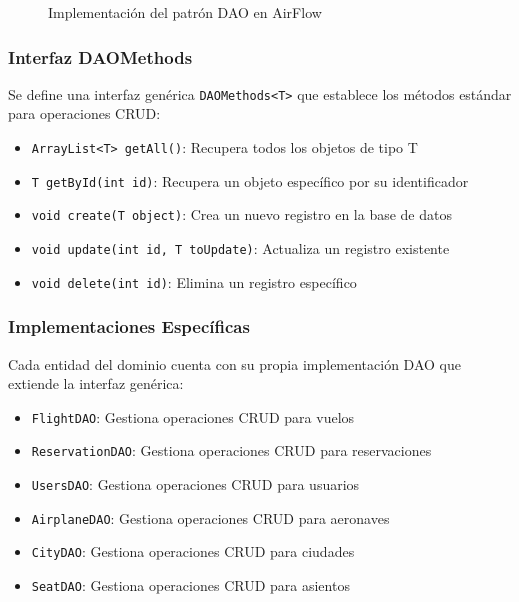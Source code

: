 \documentclass[12pt,a4paper]{article}
\begin{document}
\begin{figure}[H]
\centering
{}
\caption{Implementación del patrón DAO en AirFlow}
\end{figure}

\subsubsection{Interfaz DAOMethods}

Se define una interfaz genérica \texttt{DAOMethods<T>} que establece los métodos estándar para operaciones CRUD:

\begin{itemize}
    \item \texttt{ArrayList<T> getAll()}: Recupera todos los objetos de tipo T
    \item \texttt{T getById(int id)}: Recupera un objeto específico por su identificador
    \item \texttt{void create(T object)}: Crea un nuevo registro en la base de datos
    \item \texttt{void update(int id, T toUpdate)}: Actualiza un registro existente
    \item \texttt{void delete(int id)}: Elimina un registro específico
\end{itemize}

\subsubsection{Implementaciones Específicas}

Cada entidad del dominio cuenta con su propia implementación DAO que extiende la interfaz genérica:

\begin{itemize}
    \item \texttt{FlightDAO}: Gestiona operaciones CRUD para vuelos
    \item \texttt{ReservationDAO}: Gestiona operaciones CRUD para reservaciones
    \item \texttt{UsersDAO}: Gestiona operaciones CRUD para usuarios
    \item \texttt{AirplaneDAO}: Gestiona operaciones CRUD para aeronaves
    \item \texttt{CityDAO}: Gestiona operaciones CRUD para ciudades
    \item \texttt{SeatDAO}: Gestiona operaciones CRUD para asientos
\end{itemize}
\end{document}
